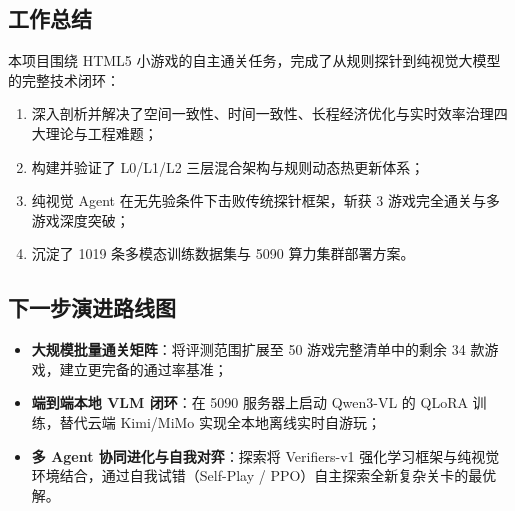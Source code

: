 \documentclass[11pt,a4paper]{ctexart}
\begin{document}
\subsection{工作总结}
本项目围绕 HTML5 小游戏的自主通关任务，完成了从规则探针到纯视觉大模型的完整技术闭环：
\begin{enumerate}
  \item 深入剖析并解决了空间一致性、时间一致性、长程经济优化与实时效率治理四大理论与工程难题；
  \item 构建并验证了 L0/L1/L2 三层混合架构与规则动态热更新体系；
  \item 纯视觉 Agent 在无先验条件下击败传统探针框架，斩获 3 游戏完全通关与多游戏深度突破；
  \item 沉淀了 1019 条多模态训练数据集与 5090 算力集群部署方案。
\end{enumerate}

\subsection{下一步演进路线图}
\begin{itemize}
  \item \textbf{大规模批量通关矩阵}：将评测范围扩展至 50 游戏完整清单中的剩余 34 款游戏，建立更完备的通过率基准；
  \item \textbf{端到端本地 VLM 闭环}：在 5090 服务器上启动 Qwen3-VL 的 QLoRA 训练，替代云端 Kimi/MiMo 实现全本地离线实时自游玩；
  \item \textbf{多 Agent 协同进化与自我对弈}：探索将 Verifiers-v1 强化学习框架与纯视觉环境结合，通过自我试错（Self-Play / PPO）自主探索全新复杂关卡的最优解。
\end{itemize}
\end{document}
